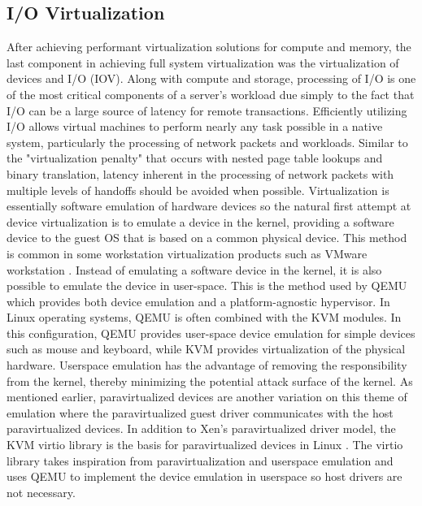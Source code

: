 \subsection{I/O Virtualization}
\label{sec:vt_io}
After achieving performant virtualization solutions for compute and memory, the last component in achieving full system virtualization was the virtualization of devices and I/O (IOV).
Along with compute and storage, processing of I/O is one of the most critical components of a server's workload due simply to the fact that I/O can be a large source of latency for remote transactions.
Efficiently utilizing I/O allows virtual machines to perform nearly any task possible in a native system, particularly the processing of network packets and workloads.
Similar to the "virtualization penalty" that occurs with nested page table lookups and binary translation, latency inherent in the processing of network packets with multiple levels of handoffs should be avoided when possible.
Virtualization is essentially software emulation of hardware devices so the natural first attempt at device virtualization is to emulate a device in the kernel, providing a software device to the guest OS that is based on a common physical device.
This method is common in some workstation virtualization products such as VMware workstation \autocite{_jones_1}.
Instead of emulating a software device in the kernel, it is also possible to emulate the device in user-space.
This is the method used by QEMU which provides both device emulation and a platform-agnostic hypervisor.
In Linux operating systems, QEMU is often combined with the KVM modules. 
In this configuration, QEMU provides user-space device emulation for simple devices such as mouse and keyboard, while KVM provides virtualization of the physical hardware.
Userspace emulation has the advantage of removing the responsibility from the kernel, thereby minimizing the potential attack surface of the kernel.
As mentioned earlier, paravirtualized devices are another variation on this theme of emulation where the paravirtualized guest driver communicates with the host paravirtualized devices.
In addition to Xen's paravirtualized driver model, the KVM virtio library is the basis for paravirtualized devices in Linux \autocite{_virtio_1}.
The virtio library takes inspiration from paravirtualization and userspace emulation and uses QEMU to implement the device emulation in userspace so host drivers are not necessary.


